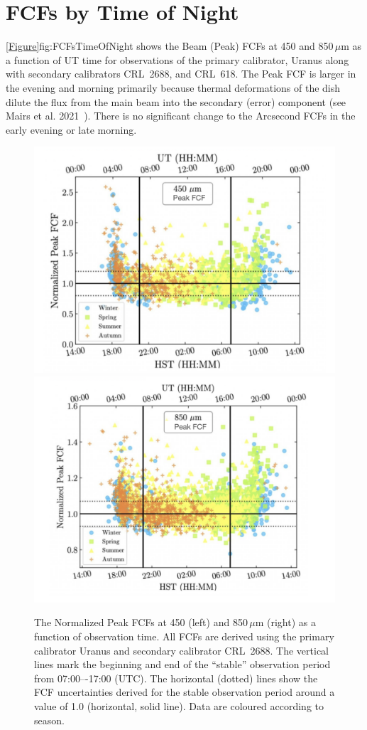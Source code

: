 \chapter{FCFs by Time of Night}
\label{app:fcfstime}

\cref{Figure}{fig:FCFsTimeOfNight}{} shows the Beam (Peak) FCFs at
450 and 850\,$\mu$m as a function of UT time for observations of the
primary calibrator, Uranus along with secondary calibrators CRL~2688, and CRL~618.
The Peak FCF is larger in the evening and morning primarily because thermal
deformations of the dish dilute the flux from the main beam into the secondary
(error) component (see Mairs et al. 2021~\cite{mairs21}). There is no significant
change to the Arcsecond FCFs in the early evening or late morning.

\begin{figure}
\begin{center}
\includegraphics[width=0.47\linewidth]{sc21-FCFsTimeOfNight-450} \hspace{0.02\linewidth}
\includegraphics[width=0.47\linewidth]{sc21-FCFsTimeOfNight-850}
\caption[FCFs Time of Night]{The Normalized Peak FCFs at 450 (left) and 850\,$\mu$m (right)
as a function of observation time. All FCFs are derived using the primary calibrator Uranus and
secondary calibrator CRL~2688. The vertical lines mark the beginning and end of the “stable” observation
period from 07:00–-17:00 (UTC). The horizontal (dotted) lines show the FCF uncertainties derived for the
stable observation period around a value of 1.0 (horizontal, solid line).
Data are coloured according to season. \label{fig:FCFsTimeOfNight}}
\end{center}
\end{figure}

